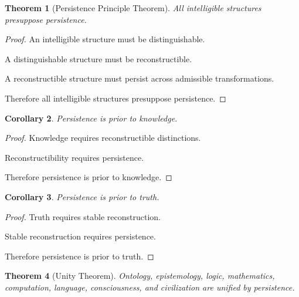 \documentclass[12pt,oneside]{article}
\newtheorem{theorem}{Theorem}[section] \newtheorem{lemma}[theorem]{Lemma} \newtheorem{proposition}[theorem]{Proposition} \newtheorem{corollary}[theorem]{Corollary}
\theoremstyle{definition}
\begin{document}
\begin{theorem}[Persistence Principle Theorem]

All intelligible structures presuppose persistence.

\end{theorem}

\begin{proof}

An intelligible structure must be distinguishable.

A distinguishable structure must be reconstructible.

A reconstructible structure must persist across admissible transformations.

Therefore all intelligible structures presuppose persistence.

\end{proof}

\begin{corollary}

Persistence is prior to knowledge.

\end{corollary}

\begin{proof}

Knowledge requires reconstructible distinctions.

Reconstructibility requires persistence.

Therefore persistence is prior to knowledge.

\end{proof}

\begin{corollary}

Persistence is prior to truth.

\end{corollary}

\begin{proof}

Truth requires stable reconstruction.

Stable reconstruction requires persistence.

Therefore persistence is prior to truth.

\end{proof}

\begin{theorem}[Unity Theorem]

Ontology, epistemology, logic, mathematics, computation, language, consciousness, and civilization are unified by persistence.

\end{theorem}
\end{document}
